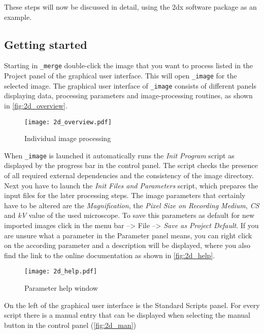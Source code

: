 These steps will now be discussed in detail, using the 2dx software package as an example. 

\subsection{Getting started}


Starting in {\twodx}\texttt{\_merge} double-click the image that you want to process listed in the Project panel of the graphical user interface. This will open {\twodx}\texttt{\_image} for the selected image. The graphical user interface of {\twodx}\texttt{\_image} consists of different panels displaying data, processing parameters and image-processing routines, as shown in \autoref{fig:2d_overview}. 
	
	\begin{figure}[H]
		\centering
		\texttt{[image: 2d\_overview.pdf]}
		\caption{Individual image processing}
		\label{fig:2d_overview}
	\end{figure}

When {\twodx}\texttt{\_image} is launched it automatically runs the \textit{Init Program} script as displayed by the progress bar in the control panel. The script checks the presence of all required external dependencies and the consistency of the image directory. Next you have to launch the \textit{Init Files and Parameters} script, which prepares the input files for the later processing steps. The image parameters that certainly have to be altered are the \textit{Magnification}, the \textit{Pixel Size on Recording Medium}, \textit{CS} and \textit{kV} value of the used microscope. To save this parameters as default for new imported images click in the menu bar --> File --> \textit{Save as Project Default}. 
If you are unsure what a parameter in the Parameter panel means, you can right click on the according parameter and a description will be displayed, where you also find the link to the online documentation as shown in \autoref{fig:2d_help}. 

\begin{figure}[H]
		\centering
		\texttt{[image: 2d\_help.pdf]}
		\caption{Parameter help window}
		\label{fig:2d_help}
	\end{figure}

On the left of the graphical user interface is the Standard Scripts panel. For every script there is a manual entry that can be displayed when selecting the manual button in the control panel (\autoref{fig:2d_man})
	
